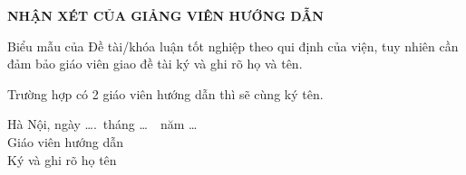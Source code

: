 \thispagestyle{empty}

\begin{center}
    {\fontsize{13}{16}\selectfont\bfseries NHẬN XÉT CỦA GIẢNG VIÊN HƯỚNG DẪN}
\end{center}

\vspace{0.8cm}

Biểu mẫu của Đề tài/khóa luận tốt nghiệp theo qui định của viện, tuy nhiên cần đảm bảo giáo viên giao đề tài ký và ghi rõ họ và tên.

Trường hợp có 2 giáo viên hướng dẫn thì sẽ cùng ký tên.

\vspace{9cm}

\begin{flushright}
    \begin{minipage}{0.35\textwidth}
        \centering
        Hà Nội, ngày \dots.\ tháng \dots\ \ năm \dots\\[12pt]
        {\fontsize{13}{16}\selectfont Giáo viên hướng dẫn}\\[20pt]
        {\fontsize{10}{12}\selectfont Ký và ghi rõ họ tên}
    \end{minipage}
\end{flushright}

\newpage
